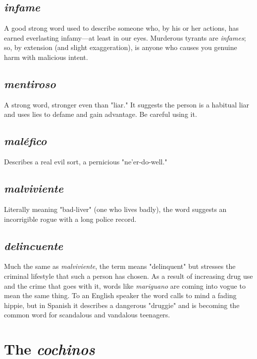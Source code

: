 \documentclass[14pt,a4paper,oneside]{memoir}
\begin{document}
\subsection{\emph{infame}}

A good strong word used to describe someone who,
by his or her actions, has earned everlasting infamy---at least in our
eyes. Murderous tyrants are \emph{infames}; so, by extension (and slight exaggeration), is anyone who causes you genuine harm with malicious
intent.

\subsection{\emph{mentiroso}}

A strong word, stronger even than "liar." It suggests the person is a habitual liar and uses lies to defame and gain advantage. Be careful using it.

\subsection{\emph{maléfico}}

Describes a real evil sort, a pernicious "ne'er-do-well."

\subsection{\emph{malviviente}}

Literally meaning "bad-liver" (one who lives
badly), the word suggests an incorrigible rogue with a long police
record.

\subsection{\emph{delincuente}}

Much the same as \emph{malviviente}, the term
means "delinquent" but stresses the criminal lifestyle that such a person has chosen. As a result of increasing drug use and the crime that
goes with it, words like \emph{mariguano} are coming into vogue to mean the
same thing. To an English speaker the word calls to mind a fading hippie, but in Spanish it describes a dangerous "druggie" and is becoming
the common word for scandalous and vandalous teenagers.

\section{The \emph{cochinos}}
\end{document}
